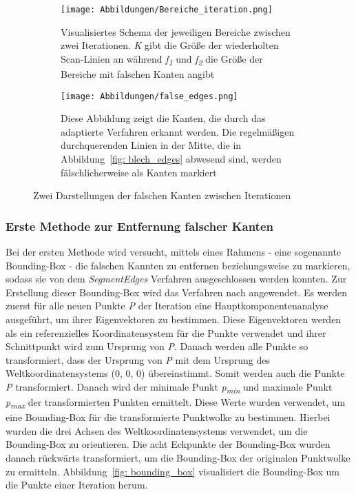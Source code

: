 \begin{figure}[h]
	\centering
	\begin{subfigure}{0.49\textwidth}
		\texttt{[image: Abbildungen/Bereiche\_iteration.png]}
		\centering
		\caption[Bereiche zwischen zwei Iterationen]{Visualisiertes Schema der jeweiligen Bereiche zwischen zwei Iterationen. \textit{K} gibt die Größe der wiederholten Scan-Linien an während \textit{f\textsubscript{1}} und \textit{f\textsubscript{2}} die Größe der Bereiche mit falschen Kanten angibt}
		\label{fig: false_edges_schema}
	\end{subfigure}
	\hfill
	\begin{subfigure}{0.49\textwidth}
		\texttt{[image: Abbildungen/false\_edges.png]}
		\centering
		\caption[Falschen Kanten zwischen zwei Iterationen]{Diese Abbildung zeigt die Kanten, die durch das adaptierte Verfahren erkannt werden. Die regelmäßigen durchquerenden Linien in der Mitte, die in Abbildung~\ref{fig: blech_edges} abwesend sind, werden fälschlicherweise als Kanten markiert}
		\label{fig: false_edges_objekt}
	\end{subfigure}
	\caption[Schematische und reelle Darstellung falscher Kanten]{Zwei Darstellungen der falschen Kanten zwischen Iterationen}
	\label{fig: false_edges}
\end{figure}

\subsubsection{Erste Methode zur Entfernung falscher Kanten}
Bei der ersten Methode wird versucht, mittels eines Rahmens - eine sogenannte Bounding-Box - die falschen Kannten zu entfernen beziehungsweise zu markieren, sodass sie von dem \textit{SegmentEdges} Verfahren ausgeschlossen werden konnten. Zur Erstellung dieser Bounding-Box wird das Verfahren nach \textcite{mccormick_find_2015} angewendet. Es werden zuerst für alle neuen Punkte \textit{P} der Iteration eine Hauptkomponentenanalyse ausgeführt, um ihrer Eigenvektoren zu bestimmen. Diese Eigenvektoren werden als ein referenzielles Koordinatensystem für die Punkte verwendet und ihrer Schnittpunkt wird zum Ursprung von \textit{P}. Danach werden alle Punkte so transformiert, dass der Ursprung von \textit{P} mit dem Ursprung des Weltkoordinatensystems (0, 0, 0) übereinstimmt. Somit werden auch die Punkte \textit{P} transformiert. Danach wird der minimale Punkt \textit{p\textsubscript{min}} und maximale Punkt \textit{p\textsubscript{max}} der transformierten Punkten ermittelt. Diese Werte wurden verwendet, um eine Bounding-Box für die transformierte Punktwolke zu bestimmen. Hierbei wurden die drei Achsen des Weltkoordinatensystems verwendet, um die Bounding-Box zu orientieren. Die acht Eckpunkte der Bounding-Box wurden danach rückwärts transformiert, um die Bounding-Box der originalen Punktwolke zu ermitteln. Abbildung~\ref{fig: bounding_box} visualisiert die Bounding-Box um die Punkte einer Iteration herum.

